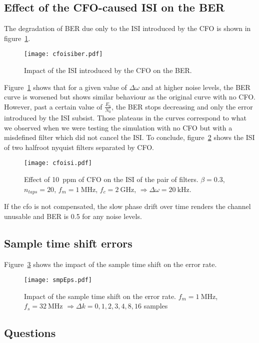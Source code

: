 \subsection{Effect of the CFO-caused ISI on the BER}
The degradation of BER due only to the ISI introduced by the CFO is shown in figure~\ref{fig:cfoisiber}.
\begin{figure}[htbp]
\centering
\texttt{[image: cfoisiber.pdf]}
\caption{Impact of the ISI introduced by the CFO on the BER.\label{fig:cfoisiber}}
\end{figure}
Figure~\ref{fig:cfoisiber} shows that for a given value of $\Delta\omega$ and at higher noise levels, the BER curve is worsened but shows similar behaviour as the original curve with no CFO.
However, past a certain value of $\frac{E_b}{N_0}$, the BER stops decreasing and only the error introduced by the ISI subsist.
Those plateaus in the curves correspond to what we observed when we were testing the simulation with no CFO but with a misdefined filter which did not cancel the ISI.
To conclude, figure~\ref{fig:cfoisi} shows the ISI of two halfroot nyquist filters separated by CFO.
\begin{figure}[htbp]
    \centering
    \texttt{[image: cfoisi.pdf]}
    \caption{Effect of \SI{10}{ppm} of CFO on the ISI of the pair of filters. $\beta = 0.3$, $n_{taps} = 20$, $f_m = \SI{1}{\mega\hertz}$, $f_c = \SI{2}{\giga\hertz}$, $\Rightarrow \Delta\omega = \SI{20}{\kilo\hertz}$.\label{fig:cfoisi}}
\end{figure}

If the cfo is not compensated, the slow phase drift over time renders the channel unusable and BER is 0.5 for any noise levels.

\subsection{Sample time shift errors}
Figure~\ref{fig:smpEps} shows the impact of the sample time shift on the error rate.
\begin{figure}[htbp]
\centering
\texttt{[image: smpEps.pdf]}
\caption{Impact of the sample time shift on the error rate. $f_m = \SI{1}{\mega\hertz}$, $f_s = \SI{32}{\mega\hertz}$ $\Rightarrow \Delta k = 0, 1, 2, 3, 4, 8, 16$ samples\label{fig:smpEps}}
\end{figure}

\subsection{Questions}
